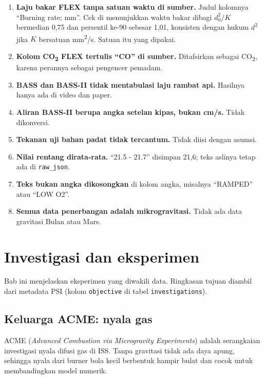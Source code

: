 \documentclass[11pt,a4paper]{report}
\newcommand{\berkas}{\path}                     %
\newcommand{\COd}{CO\textsubscript{2}}
\newcommand{\asing}[1]{\textit{#1}}             %
\begin{document}
\begin{enumerate}
\item \textbf{Laju bakar FLEX tanpa satuan waktu di sumber.} Judul kolomnya ``Burning rate; mm''.
      Cek di \berkas{kb/gold/model_report.md} menunjukkan waktu bakar dibagi
      $d_0^2/K$ bermedian 0,75 dan persentil ke-90 sebesar 1,01, konsisten dengan hukum $d^2$
      jika $K$ bersatuan mm\textsuperscript{2}/s. Satuan itu yang dipakai.
\item \textbf{Kolom CO\textsubscript{2} FLEX tertulis ``CO'' di sumber.} Ditafsirkan sebagai \COd,
      karena perannya sebagai pengencer pemadam.
\item \textbf{BASS dan BASS-II tidak mentabulasi laju rambat api.} Hasilnya hanya ada di video
      dan paper.
\item \textbf{Aliran BASS-II berupa angka setelan kipas, bukan cm/s.} Tidak dikonversi.
\item \textbf{Tekanan uji bahan padat tidak tercantum.} Tidak diisi dengan asumsi.
\item \textbf{Nilai rentang dirata-rata.} ``21.5 - 21.7'' disimpan 21,6; teks aslinya tetap ada
      di \texttt{raw\_json}.
\item \textbf{Teks bukan angka dikosongkan} di kolom angka, misalnya ``RAMPED'' atau ``LOW O2''.
\item \textbf{Semua data penerbangan adalah mikrogravitasi.} Tidak ada data gravitasi Bulan atau Mars.
\end{enumerate}

\chapter{Investigasi dan eksperimen}\label{bab:investigasi}

Bab ini menjelaskan eksperimen yang diwakili data. Ringkasan tujuan diambil dari metadata PSI
(kolom \texttt{objective} di tabel \texttt{investigations}).

\section{Keluarga ACME: nyala gas}

ACME (\asing{Advanced Combustion via Microgravity Experiments}) adalah serangkaian investigasi
nyala difusi gas di ISS. Tanpa gravitasi tidak ada daya apung, sehingga nyala dari burner bola
kecil berbentuk hampir bulat dan cocok untuk membandingkan model numerik.
\end{document}
